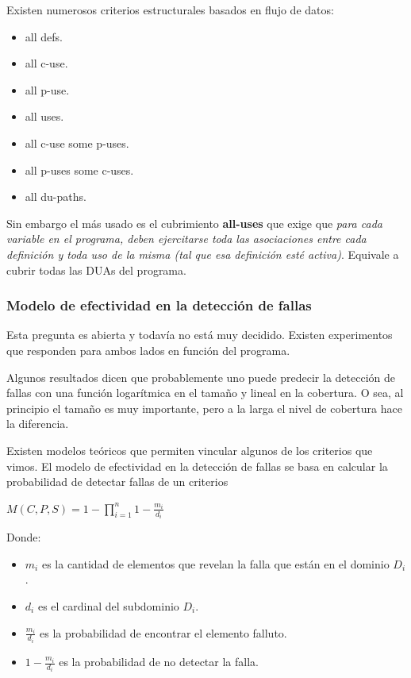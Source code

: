 \documentclass[]{article}
\begin{document}
Existen numerosos criterios estructurales basados en flujo de datos:
\begin{multicols}{2}
	\begin{itemize}
		\item all defs.
	 	\item all c-use.
 		\item all p-use.
		\item all uses.
		\item all c-use some p-uses.
		\item all p-uses some c-uses.
		\item all du-paths.
	\end{itemize}
\end{multicols}

Sin embargo el más usado es el cubrimiento \textbf{all-uses} que exige que \textit{para cada variable en el programa, deben ejercitarse toda las asociaciones entre cada definición y toda uso de la misma (tal que esa definición esté activa)}. Equivale a cubrir todas las DUAs del programa.

\begin{center}
\end{center}

\subsubsection{Modelo de efectividad en la detección de fallas}

Esta pregunta es abierta y todavía no está muy decidido. Existen experimentos que responden para ambos lados en función del programa.


Algunos resultados dicen que probablemente uno puede predecir la detección de fallas con una función logarítmica en el tamaño y lineal en la cobertura.
O sea, al principio el tamaño es muy importante, pero a la larga el nivel de cobertura hace la diferencia.

Existen modelos teóricos que permiten vincular algunos de los criterios que vimos. El modelo de efectividad en la detección de fallas se basa en calcular la probabilidad de detectar fallas de un criterios
\begin{center}
	$\displaystyle M(C,P,S) = 1-\prod_{i=1}^{n}{1-\frac{m_i}{d_i}}$
\end{center}
Donde:
\begin{itemize}
	\item $m_i$ es la cantidad de elementos que revelan la falla que están en el dominio $D_i$.
	\item $d_i$ es el cardinal del subdominio $D_i$.
	\item $\frac{m_i}{d_i}$ es la probabilidad de encontrar el elemento falluto.
	\item $1-\frac{m_i}{d_i}$ es la probabilidad de no detectar la falla.
\end{itemize}
\end{document}
